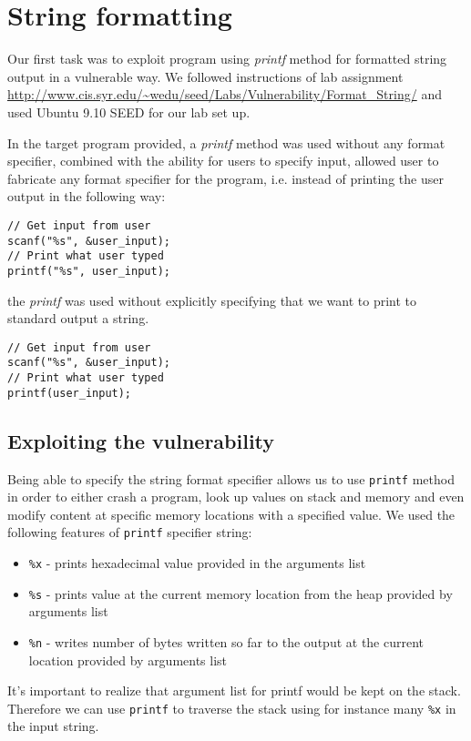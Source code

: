 \documentclass[12pt, a4paper, pdflatex]{article}
\begin{document}
\section{String formatting}

Our first task was to exploit program using \emph{printf} method for formatted string output in a vulnerable way. We followed instructions of lab assignment  \url{http://www.cis.syr.edu/~wedu/seed/Labs/Vulnerability/Format_String/}
and used Ubuntu 9.10 SEED for our lab set up.

In the target program provided, a \emph{printf} method was used without any format specifier, combined with the ability for users to specify input, allowed user to fabricate any format specifier for the program, i.e. instead of printing the user output in the following way:
\vspace{1em}
\lstset{
	captionpos=b,
	frame=single,
	language=C,
  breaklines=true,
	caption=Fragment of code that would not include the vulnerability,
	label=chroot:vul
}
\begin{lstlisting}
// Get input from user
scanf("%s", &user_input);
// Print what user typed
printf("%s", user_input);
\end{lstlisting}
the \emph{printf} was used without explicitly specifying that we want to print to standard output a string.
\vspace{1em}
\lstset{
	captionpos=b,
	frame=single,
	language=C,
  breaklines=true,
	caption=Fragment of includes the vulnerability,
	label=chroot:vul2
}
\begin{lstlisting}
// Get input from user
scanf("%s", &user_input);
// Print what user typed
printf(user_input);
\end{lstlisting}


\subsection{Exploiting the vulnerability}
Being able to specify the string format specifier allows us to use \texttt{printf} method in order to either crash a program, look up values on stack and memory and even modify content at specific memory locations with a specified value. We used the following features of \texttt{printf} specifier string:
\begin{itemize}
	\item \texttt{\%x} - prints hexadecimal value provided in the arguments list
	\item \texttt{\%s} - prints value at the current memory location from the heap provided by arguments list
	\item \texttt{\%n} - writes number of bytes written so far to the output at the current location provided by arguments list
\end{itemize}
It's important to realize that argument list for printf would be kept on the stack. Therefore we can use \texttt{printf} to traverse the stack using for instance many \texttt{\%x} in the input string.
\end{document}
